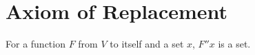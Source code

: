 \section{Axiom of Replacement}

For a function $F$ from $V$ to itself and a set $x$, $F''x$ is a set.

